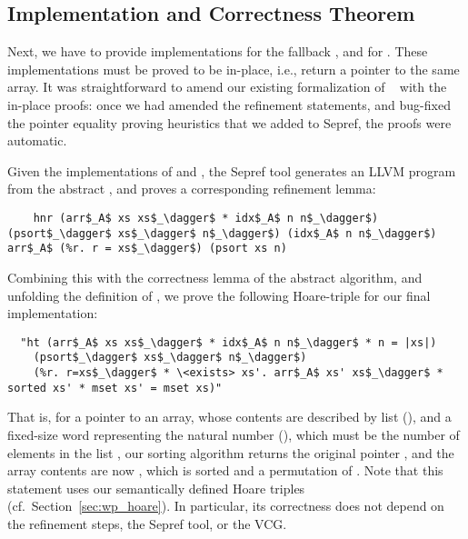 \documentclass[a4paper,UKenglish,cleveref, autoref, thm-restate]{lipics-v2021}
\begin{document}
  \subsection{Implementation and Correctness Theorem}\label{sec:impl_corr}
  Next, we have to provide implementations for the fallback , and for .
  These implementations must be proved to be in-place, i.e., return a pointer to the same array.
  It was straightforward to amend our existing formalization of ~\cite{La20} with the in-place proofs:
  once we had amended the refinement statements, and bug-fixed the pointer equality proving heuristics that we added to Sepref,
  the proofs were automatic.

  Given the implementations of  and , the Sepref tool
  generates an LLVM program  from the abstract , and proves a corresponding refinement lemma:
  \begin{lstlisting}
    hnr (arr$_A$ xs xs$_\dagger$ * idx$_A$ n n$_\dagger$) (psort$_\dagger$ xs$_\dagger$ n$_\dagger$) (idx$_A$ n n$_\dagger$) arr$_A$ (%r. r = xs$_\dagger$) (psort xs n)
  \end{lstlisting}
  Combining this with the correctness lemma of the abstract  algorithm, and unfolding the definition of ,
  we prove the following Hoare-triple for our final implementation:
  \begin{lstlisting}
  "ht (arr$_A$ xs xs$_\dagger$ * idx$_A$ n n$_\dagger$ * n = |xs|)
    (psort$_\dagger$ xs$_\dagger$ n$_\dagger$)
    (%r. r=xs$_\dagger$ * \<exists> xs'. arr$_A$ xs' xs$_\dagger$ * sorted xs' * mset xs' = mset xs)"
  \end{lstlisting}
  That is, for a pointer  to an array, whose contents are described by list  (), and a fixed-size word  representing the natural number  (),
  which must be the number of elements in the list , our sorting algorithm returns the original pointer , and the array contents are now , which is sorted and a permutation of .
  Note that this statement uses our semantically defined Hoare triples (cf.\ Section~\ref{sec:wp_hoare}).
  In particular, its correctness does not depend on the refinement steps, the Sepref tool, or the VCG.
\end{document}
